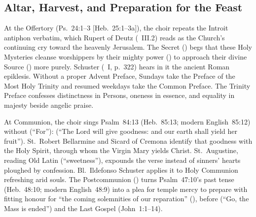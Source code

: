 \subsection{Altar, Harvest, and Preparation for the Feast}

At the Offertory (Ps.~24:1--3 [Heb.~25:1--3a]), the choir repeats the Introit antiphon verbatim, which Rupert of Deutz (~III.2) reads as the Church's continuing cry toward the heavenly Jerusalem. The Secret () begs that these Holy Mysteries cleanse worshippers by their mighty power () to approach their divine Source () more purely. Schuster (~I, p.~322) hears in it the ancient Roman epiklesis. Without a proper Advent Preface, Sundays take the Preface of the Most Holy Trinity and resumed weekdays take the Common Preface. The Trinity Preface confesses distinctness in Persons, oneness in essence, and equality in majesty beside angelic praise.

At Communion, the choir sings Psalm~84:13 (Heb.~85:13; modern English~85:12) without  (``For''):  (``The Lord will give goodness: and our earth shall yield her fruit''). St.~Robert Bellarmine and Sicard of Cremona identify that goodness with the Holy Spirit, through whom the Virgin Mary yields Christ. St.~Augustine, reading Old Latin  (``sweetness''), expounds the verse instead of sinners' hearts ploughed by confession. Bl.~Ildefonso Schuster applies it to Holy Communion refreshing arid souls. The Postcommunion () turns Psalm~47:10's past tense (Heb.~48:10; modern English~48:9) into a plea for temple mercy to prepare with fitting honour for ``the coming solemnities of our reparation'' (), before  (``Go, the Mass is ended'') and the Last Gospel (John~1:1--14).
